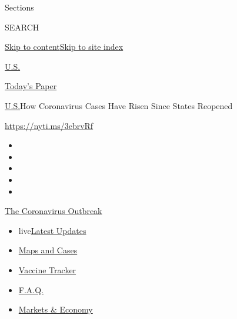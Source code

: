 Sections

SEARCH

\protect\hyperlink{site-content}{Skip to
content}\protect\hyperlink{site-index}{Skip to site index}

\href{https://www.nytimes.com/section/us}{U.S.}

\href{https://myaccount.nytimes.com/auth/login?response_type=cookie\&client_id=vi}{}

\href{https://www.nytimes.com/section/todayspaper}{Today's Paper}

\href{/section/us}{U.S.}\textbar{}How Coronavirus Cases Have Risen Since
States Reopened

\href{https://nyti.ms/3ebrvRf}{https://nyti.ms/3ebrvRf}

\begin{itemize}
\item
\item
\item
\item
\item
\end{itemize}

\href{https://www.nytimes.com/news-event/coronavirus?action=click\&pgtype=Article\&state=default\&region=TOP_BANNER\&context=storylines_menu}{The
Coronavirus Outbreak}

\begin{itemize}
\tightlist
\item
  live\href{https://www.nytimes.com/2020/08/08/world/coronavirus-updates.html?action=click\&pgtype=Article\&state=default\&region=TOP_BANNER\&context=storylines_menu}{Latest
  Updates}
\item
  \href{https://www.nytimes.com/interactive/2020/us/coronavirus-us-cases.html?action=click\&pgtype=Article\&state=default\&region=TOP_BANNER\&context=storylines_menu}{Maps
  and Cases}
\item
  \href{https://www.nytimes.com/interactive/2020/science/coronavirus-vaccine-tracker.html?action=click\&pgtype=Article\&state=default\&region=TOP_BANNER\&context=storylines_menu}{Vaccine
  Tracker}
\item
  \href{https://www.nytimes.com/interactive/2020/world/coronavirus-tips-advice.html?action=click\&pgtype=Article\&state=default\&region=TOP_BANNER\&context=storylines_menu}{F.A.Q.}
\item
  \href{https://www.nytimes.com/live/2020/08/07/business/stock-market-today-coronavirus?action=click\&pgtype=Article\&state=default\&region=TOP_BANNER\&context=storylines_menu}{Markets
  \& Economy}
\end{itemize}

